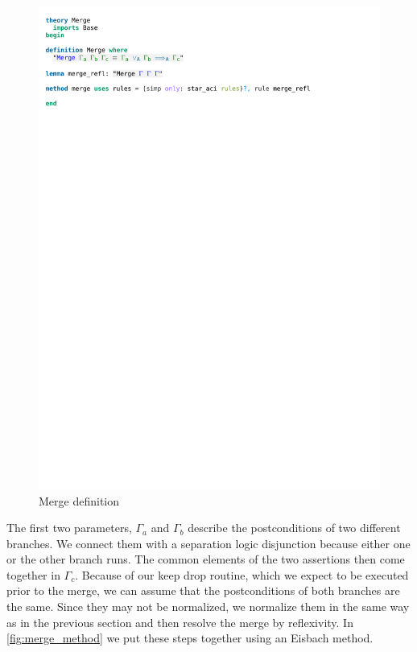 \begin{figure}[htpb]
    \includegraphics[trim={0 26,2cm 0 2,4cm}, clip, width=1.00\textwidth]{figures/Theory_Merge.pdf}
    \caption[Merge definition]{Merge definition}
    \label{fig:merge}
\end{figure}

\noindent The first two parameters, $\Gamma_a$ and $\Gamma_b$ describe the postconditions of two different branches. We connect them with a separation logic disjunction because either one or the other branch runs. The common elements of the two assertions then come together in $\Gamma_c$.
Because of our keep drop routine, which we expect to be executed prior to the merge, we can assume that the postconditions of both branches are the same. Since they may not be normalized, we normalize them in the same way as in the previous section and then resolve the merge by reflexivity. In \autoref{fig:merge_method} we put these steps together using an Eisbach method.

